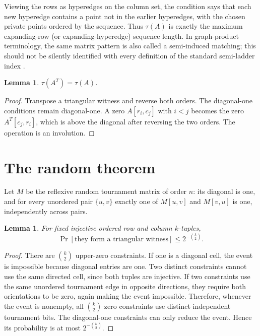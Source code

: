 \documentclass[11pt]{article}
\newtheorem{lemma}[theorem]{Lemma}
\begin{document}
Viewing the rows as hyperedges on the column set, the condition says that
each new hyperedge contains a point not in the earlier hyperedges, with the
chosen private points ordered by the sequence.  Thus $\tau(A)$ is exactly the
maximum expanding-row (or expanding-hyperedge) sequence length.  In
graph-product terminology, the same matrix pattern is also called a
semi-induced matching; this should not be silently identified with every
definition of the standard semi-ladder index
\cite{chalermsook2013,fabianski2019}.

\begin{lemma}\label{lem:transpose}
$\tau(A^T)=\tau(A)$.
\end{lemma}
\begin{proof}
Transpose a triangular witness and reverse both orders.  The diagonal-one
conditions remain diagonal-one.  A zero $A[r_i,c_j]$ with $i<j$ becomes the
zero $A^T[c_j,r_i]$, which is above the diagonal after reversing the two
orders.  The operation is an involution.
\end{proof}

\section{The random theorem}

Let $M$ be the reflexive random tournament matrix of order $n$: its diagonal
is one, and for every unordered pair $\{u,v\}$ exactly one of $M[u,v]$ and
$M[v,u]$ is one, independently across pairs.

\begin{lemma}\label{lem:union}
For fixed injective ordered row and column $k$-tuples,
\[
\Pr[\text{they form a triangular witness}]\le 2^{-\binom{k}{2}}.
\]
\end{lemma}
\begin{proof}
There are $\binom{k}{2}$ upper-zero constraints.  If one is a diagonal cell,
the event is impossible because diagonal entries are one.  Two distinct
constraints cannot use the same directed cell, since both tuples are
injective.  If two constraints use the same unordered tournament edge in
opposite directions, they require both orientations to be zero, again making
the event impossible.  Therefore, whenever the event is nonempty, all
$\binom{k}{2}$ zero constraints use distinct independent tournament bits.
The diagonal-one constraints can only reduce the event.  Hence its probability
is at most $2^{-\binom{k}{2}}$.
\end{proof}
\end{document}
